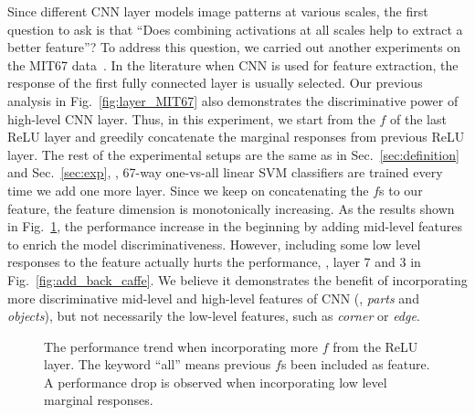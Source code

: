 \documentclass[10pt,twocolumn,letterpaper]{article}
\begin{document}
Since different CNN layer models image patterns at various scales, the first question to ask is that ``Does combining activations at all scales help to extract a better feature''?  To address this question, we carried out another experiments on the MIT67 data~\cite{MIT67}. In the literature when CNN is used for feature extraction, the response of the first fully connected layer is usually selected. Our previous analysis in Fig.~\ref{fig:layer_MIT67} also demonstrates the discriminative power of high-level CNN layer. Thus, in this experiment, we start from the $f$ of the last ReLU layer and greedily concatenate the marginal responses from previous ReLU layer. The rest of the experimental setups are the same as in Sec.~\ref{sec:definition} and Sec.~\ref{sec:exp}, \ie, 67-way one-vs-all linear SVM classifiers are trained every time we add one more layer. Since we keep on concatenating the $f$s to our feature, the feature dimension is monotonically increasing. As the results shown in Fig.~\ref{fig:add_back}, the performance increase in the beginning by adding mid-level features to enrich the model discriminativeness. However, including some low level responses to the feature actually hurts the performance, \ie, layer 7 and 3 in Fig.~\ref{fig:add_back_caffe}. We believe it demonstrates the benefit of incorporating more discriminative mid-level and high-level features of CNN (\ie, \textit{parts} and \textit{objects}), but not necessarily the low-level features, such as \textit{corner} or \textit{edge}. 

\begin{figure}[htbp]
\centering
\caption{The performance trend when incorporating more $f$ from the ReLU layer. The keyword ``all'' means previous $f$s been included as feature. A performance drop is observed when incorporating low level marginal responses.}

\label{fig:add_back}
\end{figure}
\end{document}
